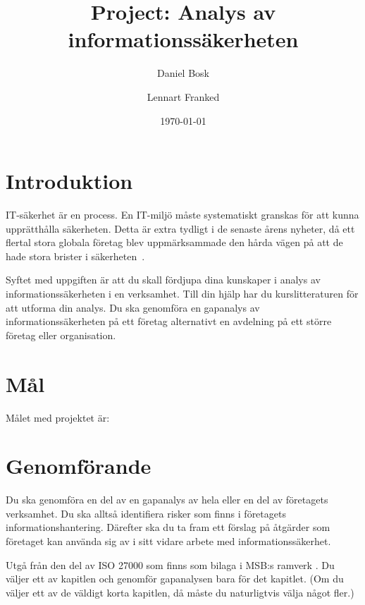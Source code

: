 \documentclass[a4paper]{llncs}
\begin{document}
\title{Project: Analys av informationssäkerheten}
\author{%
  Daniel Bosk
  \and
  Lennart Franked
}
\date{\today}

\maketitle

\section{Introduktion}

IT-säkerhet är en process.
En IT-miljö måste systematiskt granskas för att kunna upprätthålla säkerheten.
Detta är extra tydligt i de senaste årens nyheter, då ett flertal stora globala 
företag blev uppmärksammade den hårda vägen på att de hade stora brister 
i säkerheten~\cite[se][]{Fisher2011rsa,Hunt2011abs,Cluley2012twp,%
  Oberheide2010bao,Cubrilovic2009rhf,%
  Jones2013targethack,Ducklin2014targethack,Zetter2014targethack%
}.

Syftet med uppgiften är att du skall fördjupa dina kunskaper i analys av 
informationssäkerheten i en verksamhet.
Till din hjälp har du kurslitteraturen för att utforma din analys.
Du ska genomföra en gapanalys av informationssäkerheten på ett företag 
alternativt en avdelning på ett större företag eller organisation.


\section{Mål}

Målet med projektet är:
\begin{itemize}
	
\end{itemize}


\section{Genomförande}
\noindent
Du ska genomföra en del av en gapanalys av hela eller en del av företagets 
verksamhet.
Du ska alltså identifiera risker som finns i företagets informationshantering.
Därefter ska du ta fram ett förslag på åtgärder som företaget kan använda sig 
av i sitt vidare arbete med informationssäkerhet.

Utgå från den del av ISO 27000 som finns som bilaga i MSB:s ramverk 
\cite{MSB2011gb}.
Du väljer ett av kapitlen och genomför gapanalysen bara för det kapitlet.
(Om du väljer ett av de väldigt korta kapitlen, då måste du naturligtvis välja 
något fler.)
\end{document}
